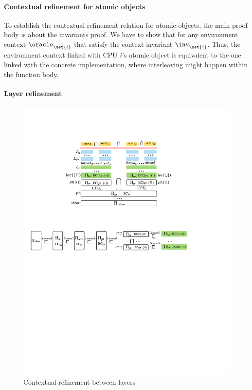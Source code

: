 \paragraph{Contextual refinement for atomic objects}
To establish the contextual refinement relation
for atomic objects, the main proof body is about the invariants proof.
We have to show that for any environment context $\oracle_{\bar{\set{i}}}$
that satisfy the context invariant $\inv_{\bar{\set{i}}}$.
Thus, the environment context linked with CPU $i$'s atomic object
is equivalent to the one linked with the concrete implementation,
where interleaving might happen within the function body.

\paragraph{Layer refinement}

\begin{figure}
\begin{center}
\includegraphics[scale=0.7]{figs/refine_layer}
\vspace*{-8pt}	
\end{center}
\caption{Contextual refinement between layers}
\label{fig:spec:refine_layer}
\vspace*{-10pt}
\end{figure}

